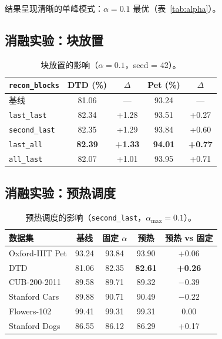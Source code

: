 \documentclass[preprint,12pt]{elsarticle}
\begin{document}
结果呈现清晰的单峰模式：$\alpha = 0.1$ 最优（表~\ref{tab:alpha}）。

\subsection{消融实验：块放置}

\begin{table}[t]
\centering
\caption{块放置的影响（$\alpha = 0.1$，seed = 42）。}\label{tab:placement}
\begin{tabular}{lcccc}
\toprule
\texttt{recon\_blocks} & DTD (\%) & $\Delta$ & Pet (\%) & $\Delta$ \\
\midrule
基线 & 81.06 & --- & 93.24 & --- \\
\texttt{last\_last} & 82.34 & +1.28 & 93.51 & +0.27 \\
\texttt{second\_last} & 82.35 & +1.29 & 93.84 & +0.60 \\
\texttt{last\_all} & \textbf{82.39} & \textbf{+1.33} & \textbf{94.01} & \textbf{+0.77} \\
\texttt{all\_last} & 82.07 & +1.01 & 93.95 & +0.71 \\
\bottomrule
\end{tabular}
\end{table}

\subsection{消融实验：预热调度}

\begin{table}[t]
\centering
\caption{预热调度的影响（\texttt{second\_last}，$\alpha_{\max} = 0.1$）。}\label{tab:warmup}
\begin{tabular}{lcccc}
\toprule
数据集 & 基线 & 固定 $\alpha$ & 预热 & 预热 vs 固定 \\
\midrule
Oxford-IIIT Pet & 93.24 & 93.84 & 93.90 & +0.06 \\
DTD & 81.06 & 82.35 & \textbf{82.61} & \textbf{+0.26} \\
CUB-200-2011 & 89.58 & 89.71 & 89.32 & $-0.39$ \\
Stanford Cars & 89.88 & 90.71 & 90.49 & $-0.22$ \\
Flowers-102 & 99.41 & 99.31 & 99.31 & $0.00$ \\
Stanford Dogs & 86.55 & 86.12 & 86.29 & +0.17 \\
\bottomrule
\end{tabular}
\end{table}
\end{document}
